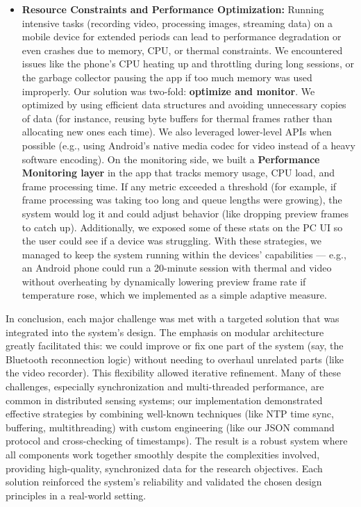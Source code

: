 \begin{itemize}
\item \textbf{Resource Constraints and Performance Optimization:} Running
  intensive tasks (recording video, processing images, streaming data)
  on a mobile device for extended periods can lead to performance
  degradation or even crashes due to memory, CPU, or thermal
  constraints. We encountered issues like the phone's CPU heating up and
  throttling during long sessions, or the garbage collector pausing the
  app if too much memory was used improperly. Our solution was two-fold:
  \textbf{optimize and monitor}. We optimized by using efficient data
  structures and avoiding unnecessary copies of data (for instance,
  reusing byte buffers for thermal frames rather than allocating new
  ones each time). We also leveraged lower-level APIs when possible
  (e.g., using Android's native media codec for video instead of a heavy
  software encoding). On the monitoring side, we built a \textbf{Performance
  Monitoring layer} in the app that tracks memory usage, CPU load, and
  frame processing
  time\cite{ref57}.
  If any metric exceeded a threshold (for example, if frame processing
  was taking too long and queue lengths were growing), the system would
  log it and could adjust behavior (like dropping preview frames to
  catch up). Additionally, we exposed some of these stats on the PC UI
  so the user could see if a device was struggling. With these
  strategies, we managed to keep the system running within the devices'
  capabilities --- e.g., an Android phone could run a 20-minute session
  with thermal and video without overheating by dynamically lowering
  preview frame rate if temperature rose, which we implemented as a
  simple adaptive measure.

\end{itemize}
In conclusion, each major challenge was met with a targeted solution
that was integrated into the system's design. The emphasis on modular
architecture greatly facilitated this: we could improve or fix one part
of the system (say, the Bluetooth reconnection logic) without needing to
overhaul unrelated parts (like the video recorder). This flexibility
allowed iterative refinement. Many of these challenges, especially
synchronization and multi-threaded performance, are common in
distributed sensing systems; our implementation demonstrated effective
strategies by combining well-known techniques (like NTP time sync,
buffering, multithreading) with custom engineering (like our JSON
command protocol and cross-checking of timestamps). The result is a
robust system where all components work together smoothly despite the
complexities involved, providing high-quality, synchronized data for the
research objectives. Each solution reinforced the system's reliability
and validated the chosen design principles in a real-world setting.

